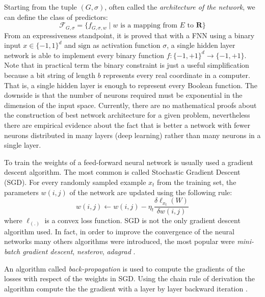 Starting from the tuple $(G, \sigma)$, often called the \emph{architecture of the network}, we can define the class of predictors: 
\[ \mathcal{F}_{G, \sigma} = \{ f_{G, \sigma, w} \mid w \textrm{ is a mapping from } E \textrm{ to } \mathbf R \} \]
From an expressiveness standpoint, it is proved that with a FNN using a binary input $x \in \{-1, 1\}^d$ and $\mathrm{sign}$ as activation
function $\sigma$, a single hidden layer network is able to
implement every binary function $f: \{-1, +1\}^d \to \{-1, +1\}$. Note that in practical term the binary constraint is just a useful simplification because a bit string of length $b$ represents every real coordinate in a computer.  That is, a single hidden layer is
enough to represent every Boolean function. The downside is that
the number of neurons required must be exponential in the dimension
of the input space. Currently, there are no mathematical proofs about the construction of
best network architecture for a given problem, nevertheless there are empirical evidence
about the fact that is better a network with fewer neurons distributed in many layers (deep
learning) rather than many neurons in a single layer. %

To train the weights of a feed-forward neural network is usually
used a gradient descent algorithm. The most common is called
Stochastic Gradient Descent (SGD). For every randomly sampled
example $x_t$ from the training set, the parameters $w(i, j)$ of the
network are updated using the following rule:
\begin{equation} \label{eq:sgd} 
w(i, j) \leftarrow w(i, j) -  \eta_t \frac{\delta\ell_{x_t}(W)}{\delta w(i, j )}
\end{equation}
where $\ell_(.)$ is a convex loss function. SGD is not the only
gradient descent algorithm used. In fact, in order to
improve the convergence of the neural networks many others algorithms were introduced,
the most popular were \emph{mini-batch gradient descent}, \emph{nesterov}, \emph{adagrad}
\cite{RuderGDOpt}. 

An algorithm called \emph{back-propagation} is used to compute the
gradients of the losses with respect of the weights in SGD. Using the chain rule of derivation the algorithm compute the the gradient with a layer by layer backward iteration
\cite{HintonBackProp}.
 

